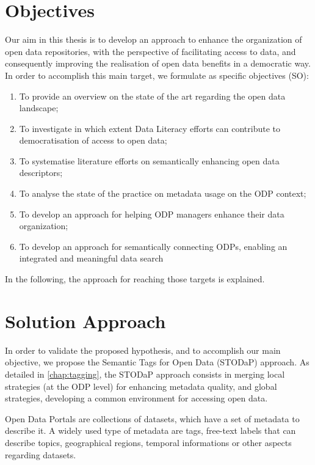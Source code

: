 {\section{Objectives}
\label{sec:objectives}
Our aim in this thesis is to develop an approach to enhance the organization of open data repositories, with the perspective of facilitating access to data, and consequently improving the realisation of open data benefits in a democratic way.
In order to accomplish this main target, we formulate as specific objectives (SO):
\begin{enumerate}
	\item To provide an overview on the state of the art regarding the open data landscape;
	\item To investigate in which extent Data Literacy efforts can contribute to democratisation of access to open data;
	\item To systematise literature efforts on semantically enhancing open data descriptors;
	\item To analyse the state of the practice on metadata usage on the ODP context;
	\item To develop an approach for helping ODP managers enhance their data organization;
	\item To develop an approach for semantically connecting ODPs, enabling an integrated and meaningful data search
\end{enumerate}

In the following, the approach for reaching those targets is explained.

\section{Solution Approach}

In order to validate the proposed hypothesis, and to accomplish our main objective, we propose the Semantic Tags for Open Data (STODaP) approach.
As detailed in \autoref{chap:tagging}, the STODaP approach consists in merging local strategies (at the ODP level) for enhancing metadata quality, and global strategies, developing a common environment for accessing open data.

Open Data Portals are collections of datasets, which have a set of metadata to describe it.
A widely used type of metadata are tags, free-text labels that can describe topics, geographical regions, temporal informations or other aspects regarding datasets.

}
